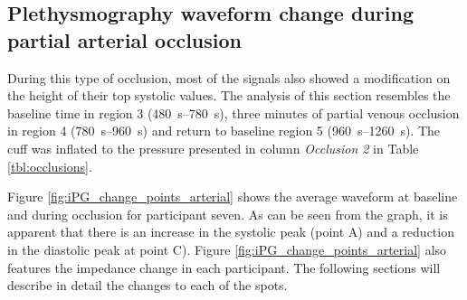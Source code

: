 \subsection{Plethysmography waveform change during partial arterial occlusion}
\label{section apa 3.2}
During this type of occlusion, most of the signals also showed a modification on the height of their top systolic values. The analysis of this section resembles the baseline time in region 3 (\SIrange{480}{780}{\second}), three minutes of partial venous occlusion in region 4 (\SIrange{780}{960}{\second}) and return to baseline region 5 (\SIrange{960}{1260}{\second}). The cuff was inflated to the pressure presented in column \textit{Occlusion 2} in Table \ref{tbl:occlusions}. 

Figure \ref{fig:iPG_change_points_arterial} shows the average waveform at baseline and during occlusion for participant seven. As can be seen from the graph, it is apparent that there is an increase in the systolic peak (point A) and a reduction in the diastolic peak at point C). Figure \ref{fig:iPG_change_points_arterial} also features the impedance change in each participant. The following sections will describe in detail the changes to each of the spots. 

